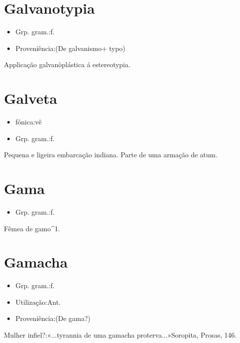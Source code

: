 \section{Galvanotypia}
\begin{itemize}
\item {Grp. gram.:f.}
\end{itemize}
\begin{itemize}
\item {Proveniência:(De \textunderscore galvanismo\textunderscore  + \textunderscore typo\textunderscore )}
\end{itemize}
Applicação galvanòplástica á estereotypia.
\section{Galveta}
\begin{itemize}
\item {fónica:vê}
\end{itemize}
\begin{itemize}
\item {Grp. gram.:f.}
\end{itemize}
Pequena e ligeira embarcação indiana.
Parte de uma armação de atum.
\section{Gama}
\begin{itemize}
\item {Grp. gram.:f.}
\end{itemize}
Fêmea de gamo^1.
\section{Gamacha}
\begin{itemize}
\item {Grp. gram.:f.}
\end{itemize}
\begin{itemize}
\item {Utilização:Ant.}
\end{itemize}
\begin{itemize}
\item {Proveniência:(De \textunderscore gama\textunderscore ?)}
\end{itemize}
Mulher infiel?:«\textunderscore ...tyrannia de uma gamacha proterva...\textunderscore »Soropita, \textunderscore Prosas\textunderscore , 146.
